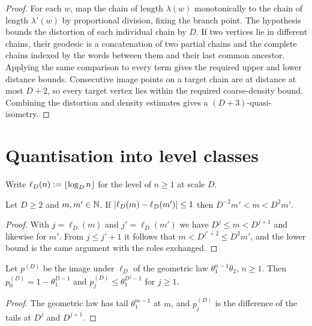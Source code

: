 \begin{proof}
\leanok
{}
For each $w$, map the chain of length $\lambda(w)$ monotonically to the chain of length
$\lambda'(w)$ by proportional division, fixing the branch point. The hypothesis bounds the
distortion of each individual chain by $D$. If two vertices lie in different chains, their
geodesic is a concatenation of two partial chains and the complete chains indexed by the words
between them and their last common ancestor. Applying the same comparison to every term gives
the required upper and lower distance bounds. Consecutive image points on a target chain are at
distance at most $D+2$, so every target vertex lies within the required coarse-density bound.
Combining the distortion and density estimates gives a $(D+3)$-quasi-isometry.
\end{proof}

\section{Quantisation into level classes}

Write $\ell_D(n):=\lfloor \log_D n \rfloor$ for the level of $n\geq1$ at scale $D$.

\begin{lemma}
\label{thm:level}
\leanok
Let $D\geq2$ and $m,m'\in\mathbb{N}$. If $\lvert \ell_D(m)-\ell_D(m') \rvert\leq1$ then $D^{-2}m'<m<D^2m'$.
\end{lemma}

\begin{proof}
\leanok
With $j=\ell_D(m)$ and $j'=\ell_D(m')$ we have $D^j\leq m<D^{j+1}$ and likewise for
$m'$. From $j\leq j'+1$ it follows that $m<D^{j'+2}\leq D^2m'$, and the lower bound is the
same argument with the roles exchanged.
\end{proof}

\begin{lemma}
\label{thm:quantised-law}
\leanok
Let $p^{(D)}$ be the image under $\ell_D$ of the geometric law $\theta_1^{n-1}\theta_2$,
$n\geq1$. Then $p^{(D)}_0=1-\theta_1^{D-1}$ and $p^{(D)}_j\leq\theta_1^{D^j-1}$ for $j\geq1$.
\end{lemma}

\begin{proof}
\leanok
{}
The geometric law has tail $\theta_1^{m-1}$ at $m$, and $p^{(D)}_j$ is the difference of
the tails at $D^j$ and $D^{j+1}$.
\end{proof}

